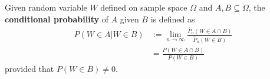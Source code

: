 \documentclass{article}
\begin{document}
   	\begin{definition}
   		Given random variable $W$ defined on sample space $\Omega$ and $A, B \subseteq \Omega$, the \textbf{conditional probability} of $A$ given $B$ is defined as
   		\begin{align}
   			P(W \in A | W \in B) &:= \lim_{n \to \infty} \frac{\hat{P}_n(W \in A \cap B)}{\hat{P}_n(W \in B)} \\
   			&= \frac{P(W \in A \cap B)}{P(W \in B)}
   		\end{align}
   		provided that $P(W \in B) \neq 0$.
   	\end{definition}
\end{document}
